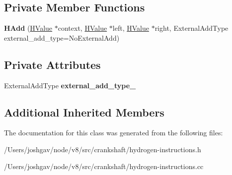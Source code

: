 \subsection*{Private Member Functions}
\begin{DoxyCompactItemize}
\item 
{\bfseries H\+Add} (\hyperlink{classv8_1_1internal_1_1_h_value}{H\+Value} $\ast$context, \hyperlink{classv8_1_1internal_1_1_h_value}{H\+Value} $\ast$left, \hyperlink{classv8_1_1internal_1_1_h_value}{H\+Value} $\ast$right, External\+Add\+Type external\+\_\+add\+\_\+type=No\+External\+Add)\hypertarget{classv8_1_1internal_1_1_h_add_a0c0f24dc7da1d9a4085a8f82b7316822}{}\label{classv8_1_1internal_1_1_h_add_a0c0f24dc7da1d9a4085a8f82b7316822}

\end{DoxyCompactItemize}
\subsection*{Private Attributes}
\begin{DoxyCompactItemize}
\item 
External\+Add\+Type {\bfseries external\+\_\+add\+\_\+type\+\_\+}\hypertarget{classv8_1_1internal_1_1_h_add_aeee7f2960b5454811f12ba3c89c39339}{}\label{classv8_1_1internal_1_1_h_add_aeee7f2960b5454811f12ba3c89c39339}

\end{DoxyCompactItemize}
\subsection*{Additional Inherited Members}


The documentation for this class was generated from the following files\+:\begin{DoxyCompactItemize}
\item 
/\+Users/joshgav/node/v8/src/crankshaft/hydrogen-\/instructions.\+h\item 
/\+Users/joshgav/node/v8/src/crankshaft/hydrogen-\/instructions.\+cc\end{DoxyCompactItemize}
